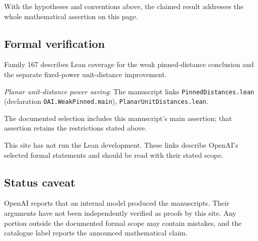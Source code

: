 \documentclass[11pt]{article}
\begin{document}
With the hypotheses and conventions above, the claimed result addresses the whole mathematical assertion on this page.

\subsection{Formal verification}
Family 167 describes Lean coverage for the weak pinned-distance conclusion and the separate fixed-power unit-distance improvement.

\textit{Planar unit-distance power saving}: The manuscript links \texttt{PinnedDistances.lean} (declaration \texttt{OAI.WeakPinned.main}), \texttt{PlanarUnitDistances.lean}.

The documented selection includes this manuscript’s main assertion; that assertion retains the restrictions stated above.

This site has not run the Lean development. These links describe OpenAI’s selected formal statements and should be read with their stated scope.

\subsection{Status caveat}
OpenAI reports that an internal model produced the manuscripts. Their arguments have not been independently verified as proofs by this site. Any portion outside the documented formal scope may contain mistakes, and the catalogue label reports the announced mathematical claim.
\end{document}
